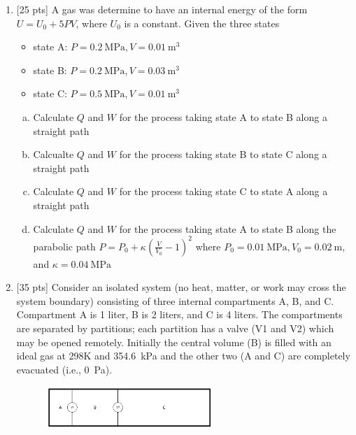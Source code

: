 \begin{enumerate}
  \item {[25 pts]} A gas was determine to have an internal energy of
    the form $U = U_0 + 5PV$, where $U_0$ is a constant. Given the
    three states
    \begin{itemize}[\textbullet]
      \item state A: $P = \SI{0.2}{\mega\pascal},  V =
        \SI{0.01}{\meter\cubed}$
      \item state B: $P = \SI{0.2}{\mega\pascal}, V = \SI{0.03}{\meter\cubed}$
      \item state C: $P = \SI{0.5}{\mega\pascal}, V = \SI{0.01}{\meter\cubed}$
    \end{itemize}
    \begin{enumerate}[(a)]
      \item Calculate $Q$ and $W$ for the process taking state A to
        state B along a straight path
      \item Calcualte $Q$ and $W$ for the process taking state B to
        state C along a straight path
      \item Calculate $Q$ and $W$ for the process taking state C to
        state A along a straight path
      \item Calculate $Q$ and $W$ for the process taking state A to
        state B along the parabolic path $P = P_0 +
        \kappa\left(\frac{V}{V_0} - 1\right)^2$ where
        $P_0 = \SI{0.01}{\mega\pascal}, V_0 = \SI{0.02}{\meter}$, and
        $\kappa = \SI{0.04}{\mega\pascal}$
    \end{enumerate}
  \item  {[35 pts]} Consider an isolated system (no heat, matter, or
    work may cross the system boundary)
    consisting of three internal compartments A, B, and C.
    Compartment A is 1 liter, B is 2 liters, and
    C is 4 liters. The compartments are separated by partitions; each
    partition has a valve (V1 and V2)
    which may be opened remotely. Initially the central volume (B) is
    filled with an ideal gas at 298K and
    \SI{354.6}{\kilo\pascal} and the other two (A and C) are
    completely evacuated (i.e., \SI{0}{\pascal}).

    \begin{figure}[ht]
      \centering
      \includegraphics[width=0.6\textwidth]{./assets/q_4_fig.png}
    \end{figure}


\end{enumerate}
